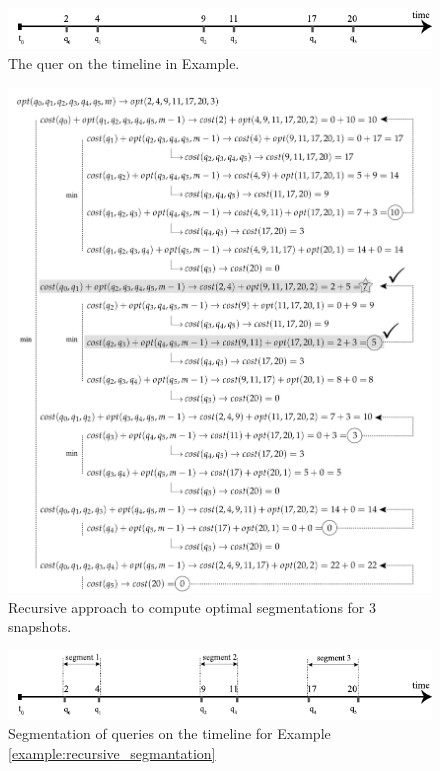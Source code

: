 			\begin{figure}
				\centering
				\includegraphics[width=\textwidth]{figs/example_recursive_q.pdf}
				\caption{The quer on the timeline in Example.}
				\label{fig:example_recursive_queries}
			\end{figure}

			\begin{figure}
				\centering
				\includegraphics[width=\textwidth]{figs/recursion_example.pdf}
				\caption{Recursive approach to compute optimal segmentations for 3 snapshots.}
				\label{fig:example_recursive_steps}
			\end{figure}


			\begin{figure}
				\centering
				\includegraphics[width=\textwidth]{figs/example_recursive_s.pdf}
				\caption{Segmentation of queries on the timeline for Example \ref{example:recursive_segmantation}}
				\label{fig:example_recursive_segmentation}
			\end{figure}


